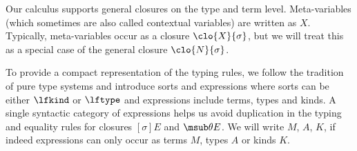 \documentclass[copyright,creativecommons]{eptcs}
\newcommand{\esub}[1]{[#1]}
\begin{document}
Our calculus supports general closures on the type and term
level. Meta-variables (which sometimes are also called contextual
variables) are written as $X$. 
Typically, meta-variables occur as a 
closure $\clo{X}{\sigma}$, but we will treat this as a special case of
the general closure $\clo{N}{\sigma}$. 

To provide a compact representation of the typing rules, we follow the
tradition of pure type systems and introduce sorts and expressions
where sorts can be either $\lfkind$ or $\lftype$ and expressions
include terms, types and kinds. A single syntactic category of
expressions helps us avoid duplication in the typing and equality
rules for closures $\esub \sigma E$ and 
$\msub \theta E$. We will write $M$, $A$, $K$, if indeed expressions
can only occur as terms $M$, types $A$ or kinds $K$.
\end{document}
